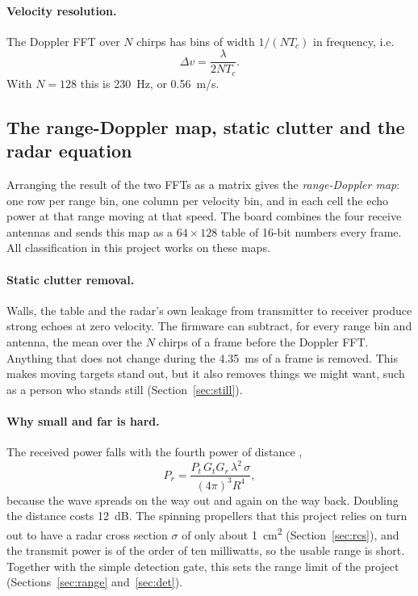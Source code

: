 \documentclass[11pt,a4paper]{article}
\begin{document}
\paragraph{Velocity resolution.} The Doppler FFT over $N$ chirps has bins of width $1/(N T_c)$ in frequency, i.e.
\begin{equation}
\Delta v = \frac{\lambda}{2 N T_c}.
\end{equation}
With $N = 128$ this is \SI{230}{Hz}, or \SI{0.56}{m/s}.

\subsection{The range-Doppler map, static clutter and the radar equation}

Arranging the result of the two FFTs as a matrix gives the \emph{range-Doppler map}: one row per range bin, one column per velocity bin, and in each cell the echo power at that range moving at that speed. The board combines the four receive antennas and sends this map as a $64 \times 128$ table of 16-bit numbers every frame. All classification in this project works on these maps.

\paragraph{Static clutter removal.} Walls, the table and the radar's own leakage from transmitter to receiver produce strong echoes at zero velocity. The firmware can subtract, for every range bin and antenna, the mean over the $N$ chirps of a frame before the Doppler FFT. Anything that does not change during the \SI{4.35}{ms} of a frame is removed. This makes moving targets stand out, but it also removes things we might want, such as a person who stands still (Section~\ref{sec:still}).

\paragraph{Why small and far is hard.} The received power falls with the fourth power of distance \cite{richards},
\begin{equation}
P_r = \frac{P_t\,G_t G_r\,\lambda^2\,\sigma}{(4\pi)^3 R^4},
\end{equation}
because the wave spreads on the way out and again on the way back. Doubling the distance costs \SI{12}{dB}. The spinning propellers that this project relies on turn out to have a radar cross section $\sigma$ of only about \SI{1}{cm^2} (Section~\ref{sec:rcs}), and the transmit power is of the order of ten milliwatts, so the usable range is short. Together with the simple detection gate, this sets the range limit of the project (Sections~\ref{sec:range} and~\ref{sec:det}).
\end{document}
